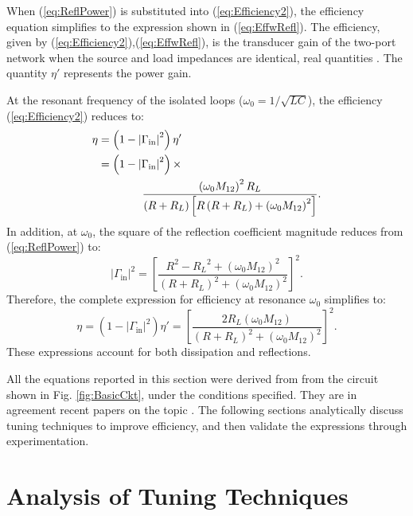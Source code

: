 \documentclass[journal]{IEEEtran}
\begin{document}
\setcounter{equation}{7}

When (\ref{eq:ReflPower}) is substituted into (\ref{eq:Efficiency2}), the efficiency equation simplifies to the expression shown in (\ref{eq:EffwRefl}). The efficiency, given by (\ref{eq:Efficiency2}),(\ref{eq:EffwRefl}), is the transducer gain of the two-port network when the source and load impedances are identical, real quantities \cite{Pozar}. The quantity $\eta'$ represents the power gain.

At the resonant frequency of the isolated  loops ($\omega_0 = 1/\sqrt{LC}$), the efficiency (\ref{eq:Efficiency2}) reduces to:
\begin{align}
\eta &= \left(1-\left|\Gamma_{\mathrm{in}}\right|^2\right) \eta' \\
&=  \left(1-\left|\Gamma_{\mathrm{in}}\right|^2\right) \times \notag \\
 &\qquad\qquad\frac{ \left(\omega_0 M_{12}\right)^2 R_L}{(R+R_L) \left[ R\left(R + R_L\right)  + \left(\omega_0 M_{12}\right)^2 \right]}.
\label{eq:Efficiency_Base}
\end{align}  In addition, at $\omega_0$, the square of the reflection coefficient magnitude reduces from (\ref{eq:ReflPower}) to:
\begin{equation}
\left|\Gamma_{\mathrm{in}}\right|^2 = \left[ \frac{R^2-{R_L}^2 + \left(\omega_0 M_{12}\right)^2 }
 {\left(R+R_L\right)^2 + \left(\omega_0 M_{12}\right)^2} \right]^2.
\label{eq:ReflPower_wkCrt}
\end{equation}
Therefore, the complete expression for efficiency at resonance $\omega_0$ simplifies to:
\begin{equation}
\eta = \left(1-\left|\Gamma_{\mathrm{in}}\right|^2\right) \eta' = \left[ \frac{2R_L \left(\omega_0 M_{12}\right)}{\left(R+R_L\right)^2 + \left(\omega_0 M_{12}\right)^2} \right]^2.
\label{eq:Efficiency_WkCrt}
\end{equation}
These expressions account for both dissipation and reflections.

All the equations reported in this section were derived from from the circuit shown in Fig. \ref{fig:BasicCkt}, under the conditions specified. They are in agreement recent papers on the topic \cite{Coil4ConsumerElec, WPTnear2far, Midfield4Implantable, MidrangeWNPTeqs}. The following sections analytically discuss tuning techniques to improve efficiency, and then validate the expressions through experimentation.

\section{Analysis of Tuning Techniques}
\end{document}

